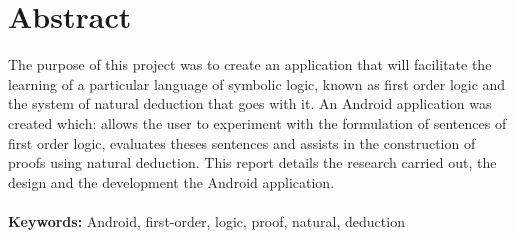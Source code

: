 
\chapter*{Abstract}

The purpose of this project was to create an application that will facilitate the learning of a particular language of symbolic logic, known as first order logic and the system of natural deduction that goes with it. An Android application was created which: allows the user to experiment with the formulation of sentences of first order logic, evaluates theses sentences and assists in the construction of proofs using natural deduction. This report details the research carried out, the design and the development the Android application.\\
\\
\noindent \textbf{Keywords:} Android, first-order, logic, proof, natural, deduction